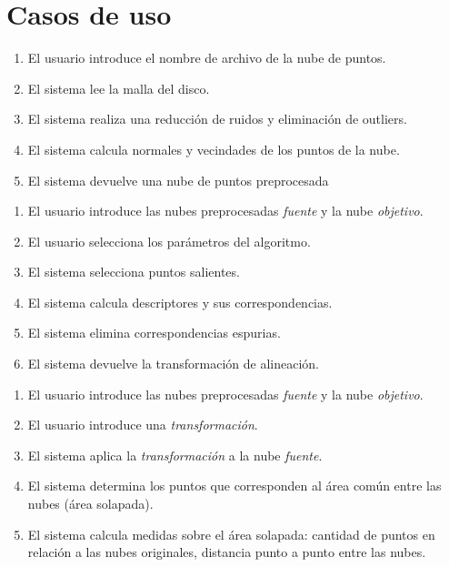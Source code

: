 \chapter{Casos de uso}


		\CUNormal
		\begin{enumerate}
			\item El usuario introduce el nombre de archivo de la nube de puntos.
			\item El sistema lee la malla del disco.
			\item El sistema realiza una reducción de ruidos y eliminación de outliers.
			\item El sistema calcula normales y vecindades de los puntos de la nube.
			\item El sistema devuelve una nube de puntos preprocesada
		\end{enumerate}

		\CUNormal
		\begin{enumerate}
			\item El usuario introduce las nubes preprocesadas \emph{fuente} y la nube \emph{objetivo}. 
			\item El usuario selecciona los parámetros del algoritmo.
			\item El sistema selecciona puntos salientes.
			\item El sistema calcula descriptores y sus correspondencias.
			\item El sistema elimina correspondencias espurias.
			\item El sistema devuelve la transformación de alineación.
		\end{enumerate}

		\CUNormal
		\begin{enumerate}
			\item El usuario introduce las nubes preprocesadas \emph{fuente} y la nube \emph{objetivo}. 
			\item El usuario introduce una \emph{transformación}.
			\item El sistema aplica la \emph{transformación} a la nube \emph{fuente}.
			\item El sistema determina los puntos que corresponden al área común entre las nubes (área solapada).
			\item El sistema calcula medidas sobre el área solapada:
				cantidad de puntos en relación a las nubes originales,
				distancia punto a punto entre las nubes.
		\end{enumerate}



